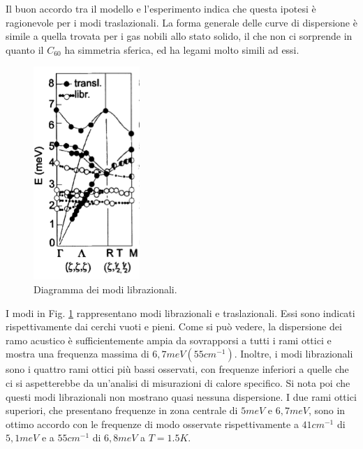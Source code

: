 \documentclass[a4paper,titlepage]{book}
\begin{document}
Il buon accordo tra il modello e l'esperimento indica che questa ipotesi è ragionevole per i modi traslazionali. 
La forma generale delle curve di dispersione è simile a quella trovata per i gas nobili allo stato solido, il che non ci sorprende in quanto il $C_{60}$ ha simmetria sferica, ed ha legami molto simili ad essi.
\begin{figure}[h!] 
	\centering
	\includegraphics[width=0.25\columnwidth]{librational.png}
	\caption{ 	\label{fig:lib}
		Diagramma dei modi librazionali.
	}
\end{figure}
I modi in Fig. \ref{fig:lib} rappresentano modi librazionali e traslazionali. Essi sono indicati rispettivamente dai cerchi vuoti e pieni. Come si può vedere, la dispersione dei ramo acustico è sufficientemente ampia da sovrapporsi a tutti i rami ottici e mostra una frequenza massima di $6,7 meV (55 cm^{-1})$. Inoltre, i modi librazionali sono i quattro rami ottici più bassi osservati, con frequenze inferiori a quelle che ci si aspetterebbe da un'analisi di misurazioni di calore specifico. Si nota poi che questi modi librazionali non mostrano quasi nessuna dispersione. I due rami ottici superiori, che presentano frequenze in zona centrale di $5 meV$ e $6,7 meV$, sono in ottimo accordo con le frequenze di modo osservate rispettivamente a $41 cm^{-1}$ di $5,1 meV$ e a $55 cm^{-1}$ di $6,8 meV$ a $T=1.5K$.
\end{document}
